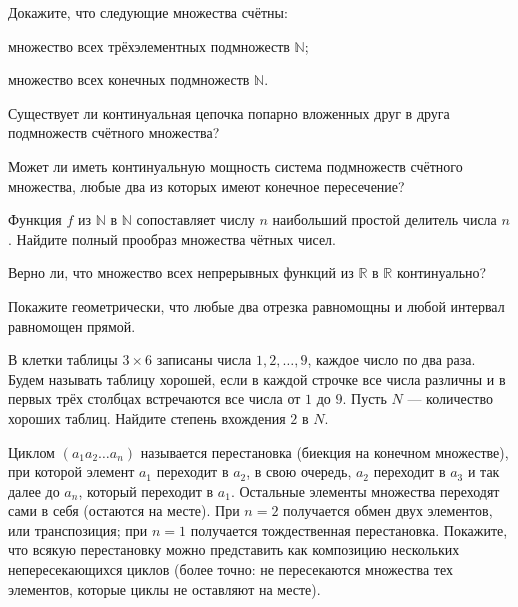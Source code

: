 \begin{problems}
\item Докажите, что следующие множества счётны:
\begin{parts}
  \item множество всех трёхэлементных подмножеств $\mathbb N$;
  \item множество всех конечных подмножеств $\mathbb N$.
\end{parts}

\item
\begin{parts}
  \item Существует ли континуальная цепочка попарно вложенных друг в друга подмножеств счётного множества?
  \item Может ли иметь континуальную мощность система подмножеств счётного множества, любые два из которых имеют конечное пересечение?
\end{parts}

\item Функция $f$ из $\mathbb N$ в $\mathbb N$ сопоставляет числу $n$ наибольший простой делитель числа $n$. Найдите полный прообраз множества чётных чисел.

\item Верно ли, что множество всех непрерывных функций из $\mathbb R$ в $\mathbb R$ континуально?

\item Покажите геометрически, что любые два отрезка равномощны и любой интервал равномощен прямой.

\item В клетки таблицы $3\times6$ записаны числа $1,2,\ldots,9$, каждое число по два раза. Будем называть таблицу хорошей, если в каждой строчке все числа различны и в первых трёх столбцах встречаются все числа от $1$ до $9$. Пусть $N$ --- количество хороших таблиц. Найдите степень вхождения $2$ в $N$.

\item Циклом $(a_1a_2\ldots a_n)$ называется перестановка (биекция на конечном множестве), при которой элемент $a_1$ переходит в $a_2$, в свою очередь, $a_2$ переходит в $a_3$ и так далее до $a_n$, который переходит в $a_1$. Остальные элементы множества переходят сами в себя (остаются на месте). При $n=2$ получается обмен двух элементов, или транспозиция; при $n=1$ получается тождественная перестановка. Покажите, что всякую перестановку можно представить как композицию нескольких непересекающихся циклов (более точно: не пересекаются множества тех элементов, которые циклы не оставляют на месте).


\end{problems}
